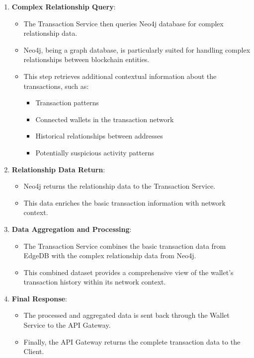 \begin{enumerate}
    \item \textbf{Complex Relationship Query}:
    \begin{itemize}
        \item The Transaction Service then queries Neo4j database for complex relationship data.
        \item Neo4j, being a graph database, is particularly suited for handling complex relationships between blockchain entities.
        \item This step retrieves additional contextual information about the transactions, such as:
        \begin{itemize}
            \item Transaction patterns
            \item Connected wallets in the transaction network
            \item Historical relationships between addresses
            \item Potentially suspicious activity patterns
        \end{itemize}
    \end{itemize}
    
    \item \textbf{Relationship Data Return}:
    \begin{itemize}
        \item Neo4j returns the relationship data to the Transaction Service.
        \item This data enriches the basic transaction information with network context.
    \end{itemize}
    
    \item \textbf{Data Aggregation and Processing}:
    \begin{itemize}
        \item The Transaction Service combines the basic transaction data from EdgeDB with the complex relationship data from Neo4j.
        \item This combined dataset provides a comprehensive view of the wallet's transaction history within its network context.
    \end{itemize}
    
    \item \textbf{Final Response}:
    \begin{itemize}
        \item The processed and aggregated data is sent back through the Wallet Service to the API Gateway.
        \item Finally, the API Gateway returns the complete transaction data to the Client.
    \end{itemize}
\end{enumerate}

